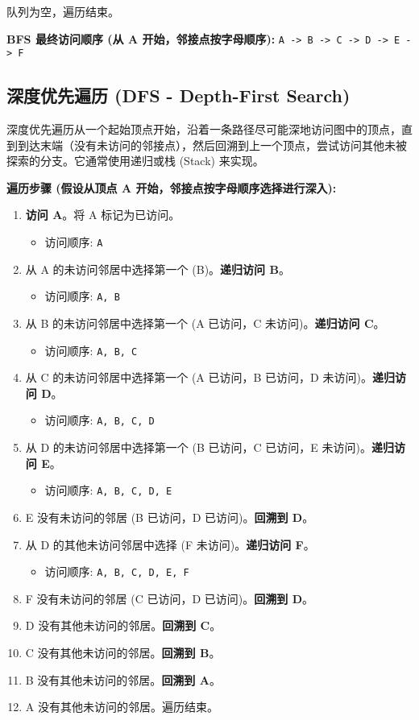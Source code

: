 队列为空，遍历结束。

\textbf{BFS 最终访问顺序 (从 A 开始，邻接点按字母顺序):} \lstinline{A -> B -> C -> D -> E -> F}

\subsection{深度优先遍历 (DFS - Depth-First Search)}

深度优先遍历从一个起始顶点开始，沿着一条路径尽可能深地访问图中的顶点，直到到达末端（没有未访问的邻接点），然后回溯到上一个顶点，尝试访问其他未被探索的分支。它通常使用递归或栈 (Stack) 来实现。

\textbf{遍历步骤 (假设从顶点 A 开始，邻接点按字母顺序选择进行深入):}

\begin{enumerate}
	\item \textbf{访问 A}。将 A 标记为已访问。
	\begin{itemize}
		\item 访问顺序: \lstinline{A}
	\end{itemize}
	\item 从 A 的未访问邻居中选择第一个 (B)。\textbf{递归访问 B}。
	\begin{itemize}
		\item 访问顺序: \lstinline{A, B}
	\end{itemize}
	\item 从 B 的未访问邻居中选择第一个 (A 已访问，C 未访问)。\textbf{递归访问 C}。
	\begin{itemize}
		\item 访问顺序: \lstinline{A, B, C}
	\end{itemize}
	\item 从 C 的未访问邻居中选择第一个 (A 已访问，B 已访问，D 未访问)。\textbf{递归访问 D}。
	\begin{itemize}
		\item 访问顺序: \lstinline{A, B, C, D}
	\end{itemize}
	\item 从 D 的未访问邻居中选择第一个 (B 已访问，C 已访问，E 未访问)。\textbf{递归访问 E}。
	\begin{itemize}
		\item 访问顺序: \lstinline{A, B, C, D, E}
	\end{itemize}
	\item E 没有未访问的邻居 (B 已访问，D 已访问)。\textbf{回溯到 D}。
	\item 从 D 的其他未访问邻居中选择 (F 未访问)。\textbf{递归访问 F}。
	\begin{itemize}
		\item 访问顺序: \lstinline{A, B, C, D, E, F}
	\end{itemize}
	\item F 没有未访问的邻居 (C 已访问，D 已访问)。\textbf{回溯到 D}。
	\item D 没有其他未访问的邻居。\textbf{回溯到 C}。
	\item C 没有其他未访问的邻居。\textbf{回溯到 B}。
	\item B 没有其他未访问的邻居。\textbf{回溯到 A}。
	\item A 没有其他未访问的邻居。遍历结束。
\end{enumerate}

